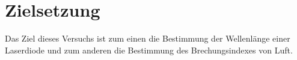 \section{Zielsetzung}
\label{sec:Ziel}
Das Ziel dieses Versuchs ist zum einen die Bestimmung der Wellenlänge einer
Laserdiode und zum anderen die Bestimmung des Brechungsindexes
von Luft.
